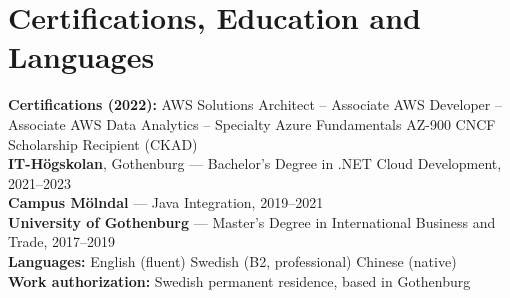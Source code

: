 \documentclass[a4paper,10pt]{article}
\begin{document}
\section*{Certifications, Education and Languages}
\textbf{Certifications (2022):} AWS Solutions Architect -- Associate \textbar{} AWS Developer -- Associate \textbar{} AWS Data Analytics -- Specialty \textbar{} Azure Fundamentals AZ-900 \textbar{} CNCF Scholarship Recipient (CKAD)\\[3pt]
\textbf{IT-H\"ogskolan}, Gothenburg --- Bachelor's Degree in .NET Cloud Development, 2021--2023\\
\textbf{Campus M\"olndal} --- Java Integration, 2019--2021\\
\textbf{University of Gothenburg} --- Master's Degree in International Business and Trade, 2017--2019\\[3pt]
\textbf{Languages:} English (fluent) \textbar{} Swedish (B2, professional) \textbar{} Chinese (native)\\
\textbf{Work authorization:} Swedish permanent residence, based in Gothenburg
\end{document}
